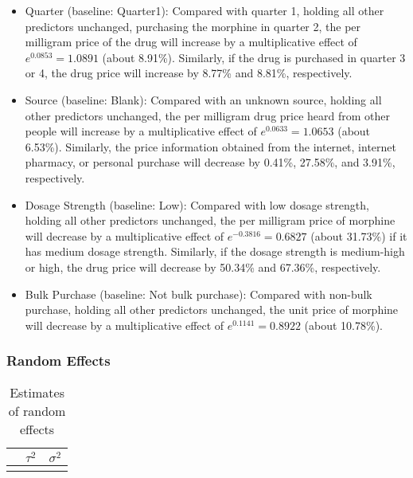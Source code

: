 \documentclass[
  11pt,
]{article}
\begin{document}
\begin{itemize}
\item
  Quarter (baseline: Quarter1): Compared with quarter 1, holding all
  other predictors unchanged, purchasing the morphine in quarter 2, the
  per milligram price of the drug will increase by a multiplicative
  effect of \(e^{0.0853} = 1.0891\) (about 8.91\%). Similarly, if the
  drug is purchased in quarter 3 or 4, the drug price will increase by
  8.77\% and 8.81\%, respectively.
\item
  Source (baseline: Blank): Compared with an unknown source, holding all
  other predictors unchanged, the per milligram drug price heard from
  other people will increase by a multiplicative effect of
  \(e^{0.0633} = 1.0653\) (about 6.53\%). Similarly, the price
  information obtained from the internet, internet pharmacy, or personal
  purchase will decrease by 0.41\%, 27.58\%, and 3.91\%, respectively.
\item
  Dosage Strength (baseline: Low): Compared with low dosage strength,
  holding all other predictors unchanged, the per milligram price of
  morphine will decrease by a multiplicative effect of
  \(e^{-0.3816} = 0.6827\) (about 31.73\%) if it has medium dosage
  strength. Similarly, if the dosage strength is medium-high or high,
  the drug price will decrease by 50.34\% and 67.36\%, respectively.
\item
  Bulk Purchase (baseline: Not bulk purchase): Compared with non-bulk
  purchase, holding all other predictors unchanged, the unit price of
  morphine will decrease by a multiplicative effect of
  \(e^{0.1141} = 0.8922\) (about 10.78\%).
\end{itemize}

\hypertarget{random-effects}{%
\subsubsection{Random Effects}\label{random-effects}}

\begin{table}[!h]

\caption{\label{tab:unnamed-chunk-34}Estimates of random effects}
\centering
\begin{tabular}[t]{l|r|r}
\hline
  & $\tau^2$ & $\sigma^2$\\
\hline
\cellcolor{gray!6}{Estimate} & \cellcolor{gray!6}{0.0161} & \cellcolor{gray!6}{0.7772}\\
\hline
\end{tabular}
\end{table}
\end{document}
